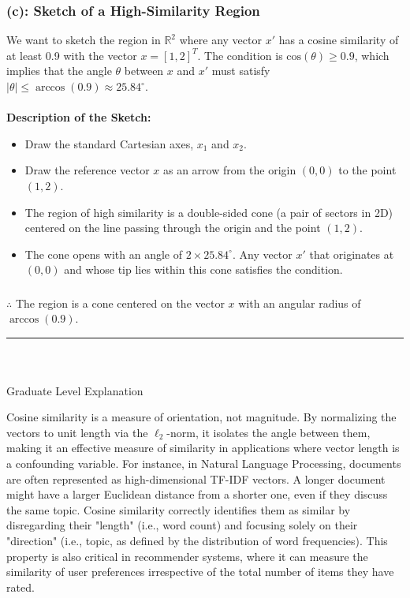 \documentclass{article}
\begin{document}
\subsubsection*{(c): Sketch of a High-Similarity Region}
\parbox{\textwidth}{
We want to sketch the region in $\mathbb{R}^2$ where any vector $x'$ has a cosine similarity of at least 0.9 with the vector $x = [1, 2]^T$. The condition is $\text{cos}(\theta) \ge 0.9$, which implies that the angle $\theta$ between $x$ and $x'$ must satisfy $|\theta| \le \arccos(0.9) \approx 25.84^\circ$.
\\~\\
\textbf{Description of the Sketch:}
\begin{itemize}
    \item Draw the standard Cartesian axes, $x_1$ and $x_2$.
    \item Draw the reference vector $x$ as an arrow from the origin $(0,0)$ to the point $(1,2)$.
    \item The region of high similarity is a double-sided cone (a pair of sectors in 2D) centered on the line passing through the origin and the point $(1,2)$.
    \item The cone opens with an angle of $2 \times 25.84^\circ$. Any vector $x'$ that originates at $(0,0)$ and whose tip lies within this cone satisfies the condition.
\end{itemize}
}
\subsubsection*{\normalfont}{$\therefore$ The region is a cone centered on the vector $x$ with an angular radius of $\arccos(0.9)$.}

\noindent\rule{\textwidth}{0.4pt}\\

\newpage

\subsubsection*{\normalfont}{Graduate Level Explanation}

\parbox{\textwidth}{
Cosine similarity is a measure of orientation, not magnitude. By normalizing the vectors to unit length via the $\ell_2$-norm, it isolates the angle between them, making it an effective measure of similarity in applications where vector length is a confounding variable. For instance, in Natural Language Processing, documents are often represented as high-dimensional TF-IDF vectors. A longer document might have a larger Euclidean distance from a shorter one, even if they discuss the same topic. Cosine similarity correctly identifies them as similar by disregarding their "length" (i.e., word count) and focusing solely on their "direction" (i.e., topic, as defined by the distribution of word frequencies). This property is also critical in recommender systems, where it can measure the similarity of user preferences irrespective of the total number of items they have rated.
}
\end{document}
